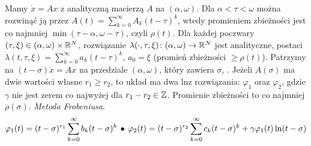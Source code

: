 Mamy $\dot x = Ax$  z analityczną macierzą $A$ na $(\alpha, \omega)$.
Dla $\alpha < \tau < \omega$ można rozwinąć ją przez $A(t) = \sum_{k=0}^\infty A_k(t - \tau)^k$, wtedy promieniem zbieżności jest co najmniej $\min (\tau - \alpha, \omega -\tau)$, czyli $\rho(t)$. 
Dla każdej poczwary $(\tau, \xi) \in (\alpha, \omega) \times \mathbb{R}^N$, rozwiązanie $\lambda(\cdot, \tau, \xi) \colon (\alpha, \omega)\to \mathbb{R}^N$ jest analityczne, postaci $\lambda(t, \tau, \xi) = \sum_{k=0}^\infty a_k(t - \tau)^k$, $a_0 = \xi$ (promień zbieżności $\ge \rho(t)$).
Patrzymy na $(t - \sigma) \dot x = Ax$ na przedziale $(\alpha, \omega)$, który zawiera $\sigma$, .
Jeżeli $A(\sigma)$ ma dwie wartości własne $r_1 \ge r_2$, to układ ma dwa lnz rozwiązania: $\varphi_1$ oraz $\varphi_2$, gdzie $\gamma$ nie jest zerem co najwyżej dla $r_1 - r_2 \in \mathbb{Z}$.
Promienie zbieżności to co najmniej $\rho(\sigma)$.
\emph{Metoda Frobeniusa}.
\[
	\varphi_1 (t) = (t-\sigma)^{r_1} \sum_{k=0}^\infty b_k (t-\sigma)^k \, \bullet \,
	\varphi_2 (t) = (t-\sigma)^{r_2} \sum_{k=0}^\infty c_k (t-\sigma)^k + \gamma \varphi_1(t) \ln(t-  \sigma)
\]